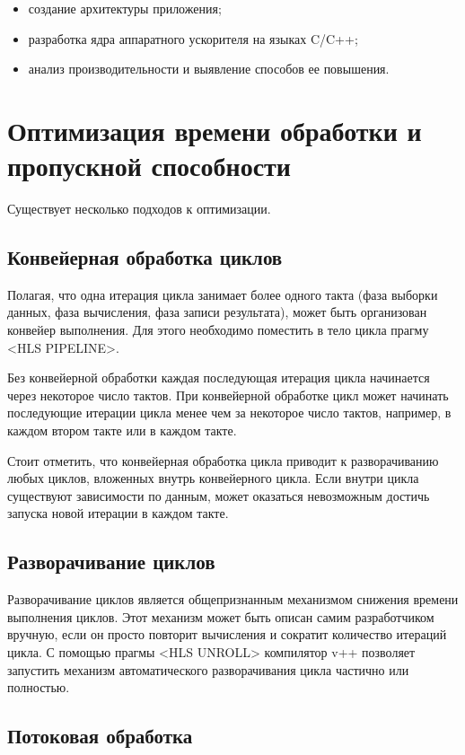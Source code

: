 \begin{itemize}
	\item создание архитектуры приложения;
	\item разработка ядра аппаратного ускорителя на языках C/C++;
	\item анализ производительности и выявление способов ее повышения.
\end{itemize}

\section{Оптимизация времени обработки и пропускной способности}

Существует несколько подходов к оптимизации.

\subsection{Конвейерная обработка циклов}

Полагая, что одна итерация цикла занимает более одного такта (фаза выборки данных, фаза вычисления, фаза записи результата), может быть организован конвейер выполнения. Для этого необходимо поместить в тело цикла прагму <HLS PIPELINE>.

Без конвейерной обработки каждая последующая итерация цикла начинается через некоторое число тактов. При конвейерной обработке цикл может начинать последующие итерации цикла менее чем за некоторое число тактов, например, в каждом втором такте или в каждом такте.

Стоит отметить, что конвейерная обработка цикла приводит к разворачиванию любых циклов, вложенных внутрь конвейерного цикла. Если внутри цикла существуют зависимости по данным, может оказаться невозможным достичь запуска новой итерации в каждом такте.

\subsection{Разворачивание циклов}

Разворачивание циклов является общепризнанным механизмом снижения времени выполнения циклов. Этот механизм может быть описан самим разработчиком вручную, если он просто повторит вычисления и сократит количество итераций цикла. С помощью прагмы <HLS UNROLL> компилятор v++ позволяет запустить механизм автоматического разворачивания цикла частично или полностью.

\subsection{Потоковая обработка}

